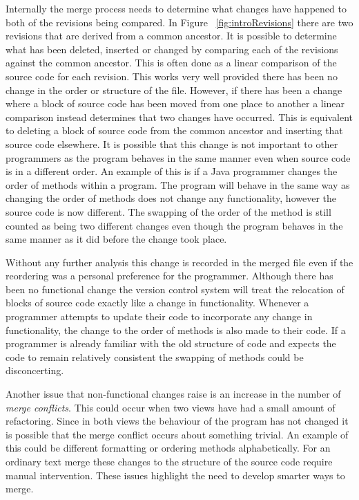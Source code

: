 Internally the merge process needs to determine what changes have happened to both of the revisions being compared. In Figure  ~\ref{fig:introRevisions} there are two revisions that are derived from a common ancestor. It is possible to determine what has been deleted, inserted or changed by comparing each of the revisions against the common ancestor.  This is often done as a linear comparison of the source code for each revision. This works very well provided there has been no change in the order or structure of the file. However, if there has been a change where a block of source code has been moved from one place to another a linear comparison instead determines that two changes have occurred.  This is equivalent to deleting a block of source code from the common ancestor and inserting that source code elsewhere. It is possible that this change is not important to other programmers as the program behaves in the same manner even when source code is in a different order.  An example of this is if a Java programmer changes the order of methods within a program.  The program will behave in the same way as changing the order of methods does not change any functionality, however the source code is now different. The swapping of the order of the method is still counted as being two different changes even though the program behaves in the same manner as it did before the change took place.

Without any further analysis this change is recorded in the merged file even if the reordering was a personal preference for the programmer.  Although there has been no functional change the version control system will treat the relocation of blocks of source code exactly like a change in functionality.  Whenever a programmer attempts to update their code to incorporate any change in functionality, the change to the order of methods is also made to their code.  If a programmer is already familiar with the old structure of code and expects the code to remain relatively consistent the swapping of methods could be disconcerting.

Another issue that non-functional changes raise is an increase in the number of \emph{merge conflicts}. This could occur when two views have had a small amount of refactoring.  Since in both views the behaviour of the program has not changed it is possible that the merge conflict occurs about something trivial. An example of this could be different formatting or ordering methods alphabetically. For an ordinary text merge these changes to the structure of the source code require manual intervention. These issues highlight the need to develop smarter ways to merge.

